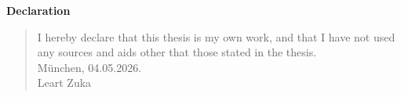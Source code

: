 \newpage
\thispagestyle{empty}

\thispagestyle{empty}

\begin{center}
\textbf{\Large Declaration}
\end{center}

\vspace{10mm}

\begin{quote}
I hereby declare that this thesis is my own work, and that I have not used any sources and aids other that those stated in the thesis. \\[1.5em]

München, 04.05.2026. \\[1em]
Leart Zuka\\
\end{quote}

\clearpage
